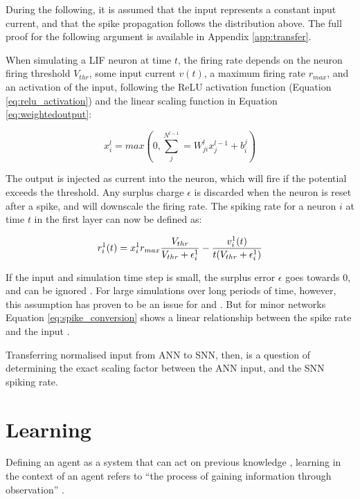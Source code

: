 \documentclass[report.tex]{subfiles}
\begin{document}
During the following, it is assumed that the input represents a constant
input current, and that the spike propagation follows the distribution
above.
The full proof for the following argument is available in Appendix \ref{app:transfer}.

When simulating a LIF
neuron at time $t$, the firing rate depends on the neuron firing threshold $V_{thr}$,
some input current $v(t)$, a maximum
firing rate $r_{max}$, and an activation of the input, following the
ReLU activation function (Equation \ref{eq:relu_activation}) and 
the linear scaling function in Equation \ref{eq:weightedoutput}:

\begin{equation}
x_i^l = max\left(0, \sum^{N^{l - 1}}_j= W^l_{ji} x_j^{l - 1} + b_i^j\right)
  \label{eq:relu_activation}
\end{equation}

The output is injected as current into the neuron, which will fire if the
potential exceeds the threshold.
Any surplus charge $\epsilon$ is discarded when the neuron is reset
after a spike, and will downscale the firing rate.
The spiking rate for a neuron $i$ at time $t$ in the first layer can
now be defined as:

\begin{equation}
r_i^1(t) = x_i^1 r_{max} {V_{thr} \over V_{thr} + \epsilon_i^1 } - {v_i^1(t) \over t (V_{thr} + \epsilon_i^1) }
\label{eq:spike_conversion}
\end{equation}

If the input and simulation time step is small, the surplus
error $\epsilon$ goes towards 0, and can be ignored \cite{Rueckauer2017}.
For large simulations over long periods of time, however, this assumption has proven to be an issue for \citeauthor{Diehl2015} and
\citeauthor{Rueckauer2017}.
But for minor networks Equation \ref{eq:spike_conversion} shows a 
linear relationship between the spike rate and the input
\cite{Rueckauer2017}.

Transferring normalised input from \gls{ANN} to \gls{SNN}, then, is
a question of determining the exact scaling factor between the \gls{ANN} input,
and the \gls{SNN} spiking rate.

\section{Learning}  \label{sec:learning}
Defining an \gls{agent} as a system that can act on previous knowledge
\cite{Russel2007}, learning in the context of an \gls{agent}
refers to ``the process of gaining
information through observation'' \cite{sep:learning-formal}.
\end{document}
